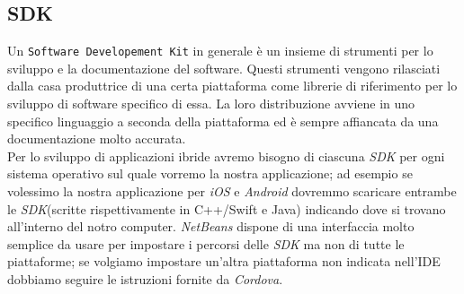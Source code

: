 \subsection{SDK}
Un \texttt{Software Developement Kit} in generale è un insieme di strumenti per lo sviluppo e la documentazione del software\cite{wiki:sdk}. Questi strumenti vengono rilasciati dalla casa produttrice di una certa piattaforma come librerie di riferimento per lo sviluppo di software specifico di essa. La loro distribuzione avviene in uno specifico linguaggio a seconda della piattaforma ed è sempre affiancata da una documentazione molto accurata.\\
Per lo sviluppo di applicazioni ibride avremo bisogno di ciascuna \emph{SDK} per ogni sistema operativo sul quale vorremo la nostra applicazione; ad esempio se volessimo la nostra applicazione per \emph{iOS} e \emph{Android} dovremmo scaricare entrambe le \emph{SDK}(scritte rispettivamente in C++/Swift e Java) indicando dove si trovano all'interno del notro computer. \emph{NetBeans} dispone di una interfaccia molto semplice da usare per impostare i percorsi delle \emph{SDK} ma non di tutte le piattaforme; se volgiamo impostare un'altra piattaforma non indicata nell'IDE dobbiamo seguire le istruzioni fornite da \emph{Cordova}.
